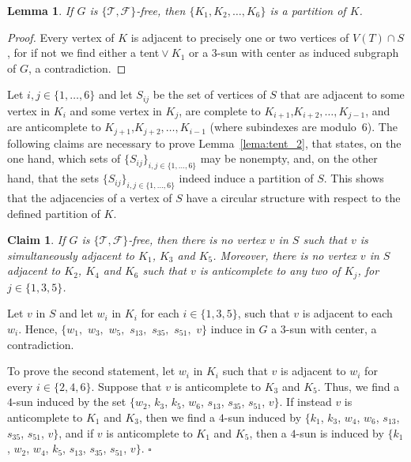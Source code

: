 \documentclass[12pt]{book}
\theoremstyle{plain}
\newtheorem{claim}[teo]{Claim}
\newtheorem{lema}[teo]{Lemma}
\theoremstyle{remark}
\newcommand*{\QED}{\hfill\ensuremath{\square}}%
\begin{document}
\begin{lema} \label{lema:tent_1}
	If $G$ is $\{ \mathcal{T}, \mathcal{F} \}$-free, then $\{K_1,K_2,\ldots,K_6\}$ is a partition of $K$.
\end{lema}

\begin{proof}
    Every vertex of $K$ is adjacent to precisely one or two vertices of $V(T) \cap S$, for if not we find either a tent${}\vee{}K_1$ or a $3$-sun with center as induced subgraph of $G$, a contradiction.
\end{proof}

Let $i,j\in\{1,\ldots,6\}$ and let $S_{ij}$ be the set of vertices of $S$ that are adjacent to some vertex in $K_i$ and some vertex in $K_j$, are complete to $K_{i+1}$,$K_{i+2},\ldots,K_{j-1}$, and are anticomplete to $K_{j+1}$,$K_{j+2},\ldots,K_{i-1}$ (where subindexes are modulo~$6$).
The following claims are necessary to prove Lemma~\ref{lema:tent_2}, that states, on the one hand, which sets of $\{S_{ij}\}_{i,j \in \{1, \ldots, 6\}}$ may be nonempty, and, on the other hand, that the sets $\{S_{ij}\}_{i,j \in \{1, \ldots, 6\}}$ indeed induce a partition of $S$.
This shows that the adjacencies of a vertex of $S$ have a circular structure with respect to the defined partition of $K$.

	\begin{claim} \label{claim:tent_1}
		If $G$ is $\{ \mathcal{T}, \mathcal{F} \}$-free, then there is no vertex $v$ in $S$ such that $v$ is simultaneously adjacent to $K_1$, $K_3$ and $K_5$.
        Moreover, there is no vertex $v$ in $S$ adjacent to $K_2$, $K_4$ and $K_6$ such that $v$ is anticomplete to any two of $K_j$, for $j \in \{1, 3, 5 \}$.
	\end{claim}
	
	 Let $v$ in $S$ and let $w_i$ in $K_i$ for each $i\in\{1,3,5\}$, such that $v$ is adjacent to each $w_i$. Hence, $\{w_1,$ $w_3,$ $w_5,$ $s_{13},$ $s_{35},$ $s_{51},$ $v\}$ induce in $G$ a $3$-sun with center, a contradiction.

    To prove the second statement, let $w_i$ in $K_i$ such that $v$ is adjacent to $w_i$ for every $i\in\{2,4,6\}$. Suppose that $v$ is anticomplete to $K_3$ and $K_5$. Thus, we find a $4$-sun induced by the set $\{ w_2$, $k_3$, $k_5$, $w_6$, $s_{13}$, $s_{35}$, $s_{51}$, $v \}$.
    If instead $v$ is anticomplete to $K_1$ and $K_3$, then we find a $4$-sun induced by $\{ k_1$, $k_3$, $w_4$, $w_6$, $s_{13}$, $s_{35}$, $s_{51}$, $v \}$, and if $v$ is anticomplete to $K_1$ and $K_5$, then a $4$-sun is induced by $\{ k_1$, $w_2$, $w_4$, $k_5$, $s_{13}$, $s_{35}$, $s_{51}$, $v \}$. \QED
    
\end{document}

